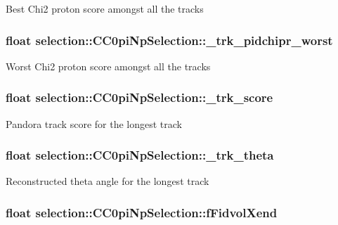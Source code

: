 Best Chi2 proton score amongst all the tracks \hypertarget{classselection_1_1CC0piNpSelection_a6c06ff43f89cbee19cf466b830a6fe38}{
\subsubsection[{\-\_\-trk\-\_\-pidchipr\-\_\-worst}]{\setlength{\rightskip}{0pt plus 5cm}float selection\-::\-C\-C0pi\-Np\-Selection\-::\-\_\-trk\-\_\-pidchipr\-\_\-worst\hspace{0.3cm}{\ttfamily [private]}}}\label{classselection_1_1CC0piNpSelection_a6c06ff43f89cbee19cf466b830a6fe38}
Worst Chi2 proton score amongst all the tracks \hypertarget{classselection_1_1CC0piNpSelection_a72517a224dc19f95faef3efde9a999d1}{
\subsubsection[{\-\_\-trk\-\_\-score}]{\setlength{\rightskip}{0pt plus 5cm}float selection\-::\-C\-C0pi\-Np\-Selection\-::\-\_\-trk\-\_\-score\hspace{0.3cm}{\ttfamily [private]}}}\label{classselection_1_1CC0piNpSelection_a72517a224dc19f95faef3efde9a999d1}
Pandora track score for the longest track \hypertarget{classselection_1_1CC0piNpSelection_a08cd38de74e9611829a3580a310c19f2}{
\subsubsection[{\-\_\-trk\-\_\-theta}]{\setlength{\rightskip}{0pt plus 5cm}float selection\-::\-C\-C0pi\-Np\-Selection\-::\-\_\-trk\-\_\-theta\hspace{0.3cm}{\ttfamily [private]}}}\label{classselection_1_1CC0piNpSelection_a08cd38de74e9611829a3580a310c19f2}
Reconstructed theta angle for the longest track \hypertarget{classselection_1_1CC0piNpSelection_a754589459e1f2d90a8ad853c68f864db}{
\subsubsection[{f\-Fidvol\-Xend}]{\setlength{\rightskip}{0pt plus 5cm}float selection\-::\-C\-C0pi\-Np\-Selection\-::f\-Fidvol\-Xend\hspace{0.3cm}{\ttfamily [private]}}}\label{classselection_1_1CC0piNpSelection_a754589459e1f2d90a8ad853c68f864db}
